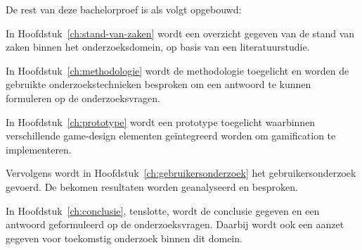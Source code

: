 
De rest van deze bachelorproef is als volgt opgebouwd:

In Hoofdstuk~\ref{ch:stand-van-zaken} wordt een overzicht gegeven van de stand van zaken binnen het onderzoeksdomein, op basis van een literatuurstudie.

In Hoofdstuk~\ref{ch:methodologie} wordt de methodologie toegelicht en worden de gebruikte onderzoekstechnieken besproken om een antwoord te kunnen formuleren op de onderzoeksvragen.

In Hoofdstuk~\ref{ch:prototype} wordt een prototype toegelicht waarbinnen verschillende game-design elementen geïntegreerd worden om gamification te implementeren.

Vervolgens wordt in Hoofdstuk~\ref{ch:gebruikersonderzoek} het gebruikersonderzoek gevoerd. De bekomen resultaten worden geanalyseerd en besproken.

In Hoofdstuk~\ref{ch:conclusie}, tenslotte, wordt de conclusie gegeven en een antwoord geformuleerd op de onderzoeksvragen. Daarbij wordt ook een aanzet gegeven voor toekomstig onderzoek binnen dit domein.